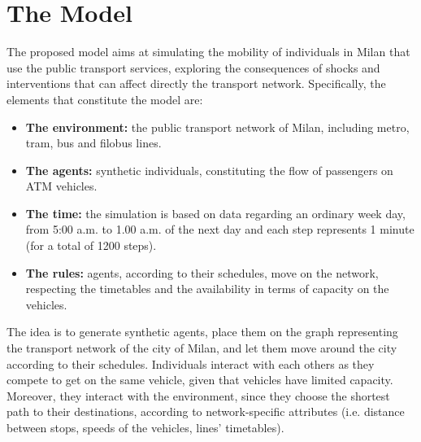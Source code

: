 \section{The Model}
The proposed model aims at simulating the mobility of individuals in Milan that use the public transport services, exploring the consequences of shocks and interventions that can affect directly the transport network. Specifically, the elements that constitute the model are:
\begin{itemize}
    \item \textbf{The environment:} the public transport network of Milan, including metro, tram, bus and filobus lines. 
    \item \textbf{The agents:} synthetic individuals, constituting the flow of passengers on ATM vehicles.
    \item \textbf{The time:} the simulation is based on data regarding an ordinary week day, from 5:00 a.m. to 1.00 a.m. of the next day and each step represents 1 minute (for a total of 1200 steps).
    \item \textbf{The rules:} agents, according to their schedules, move on the network, respecting the timetables and the availability in terms of capacity on the vehicles.
\end{itemize}
The idea is to generate synthetic agents, place them on the graph representing the transport network of the city of Milan, and let them move around the city according to their schedules. Individuals interact with each others as they compete to get on the same vehicle, given that vehicles have limited capacity. Moreover, they interact with the environment, since they choose the shortest path to their destinations, according to network-specific attributes (i.e. distance between stops, speeds of the vehicles, lines' timetables). 

